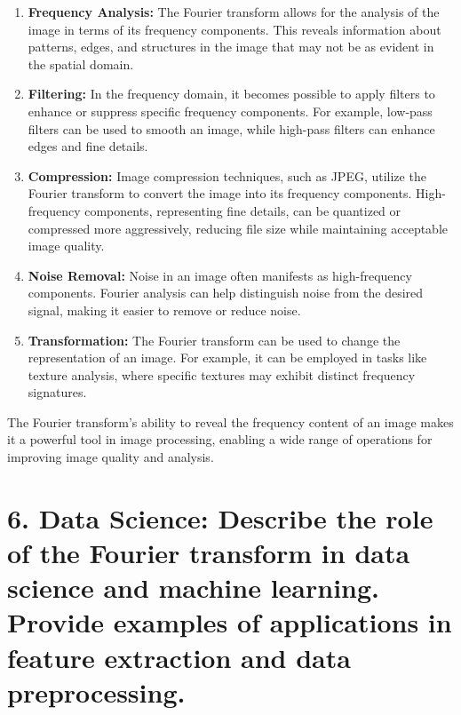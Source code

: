 \documentclass[11pt]{article}
\begin{document}
\begin{enumerate}
\def\labelenumi{\arabic{enumi}.}
\item
  \textbf{Frequency Analysis:} The Fourier transform allows for the
  analysis of the image in terms of its frequency components. This
  reveals information about patterns, edges, and structures in the image
  that may not be as evident in the spatial domain.
\item
  \textbf{Filtering:} In the frequency domain, it becomes possible to
  apply filters to enhance or suppress specific frequency components.
  For example, low-pass filters can be used to smooth an image, while
  high-pass filters can enhance edges and fine details.
\item
  \textbf{Compression:} Image compression techniques, such as JPEG,
  utilize the Fourier transform to convert the image into its frequency
  components. High-frequency components, representing fine details, can
  be quantized or compressed more aggressively, reducing file size while
  maintaining acceptable image quality.
\item
  \textbf{Noise Removal:} Noise in an image often manifests as
  high-frequency components. Fourier analysis can help distinguish noise
  from the desired signal, making it easier to remove or reduce noise.
\item
  \textbf{Transformation:} The Fourier transform can be used to change
  the representation of an image. For example, it can be employed in
  tasks like texture analysis, where specific textures may exhibit
  distinct frequency signatures.
\end{enumerate}

The Fourier transform's ability to reveal the frequency content of an
image makes it a powerful tool in image processing, enabling a wide
range of operations for improving image quality and analysis.

    \hypertarget{data-science-describe-the-role-of-the-fourier-transform-in-data-science-and-machine-learning.-provide-examples-of-applications-in-feature-extraction-and-data-preprocessing.}{%
\section{6. Data Science: Describe the role of the Fourier transform in
data science and machine learning. Provide examples of applications in
feature extraction and data
preprocessing.}\label{data-science-describe-the-role-of-the-fourier-transform-in-data-science-and-machine-learning.-provide-examples-of-applications-in-feature-extraction-and-data-preprocessing.}}
\end{document}
